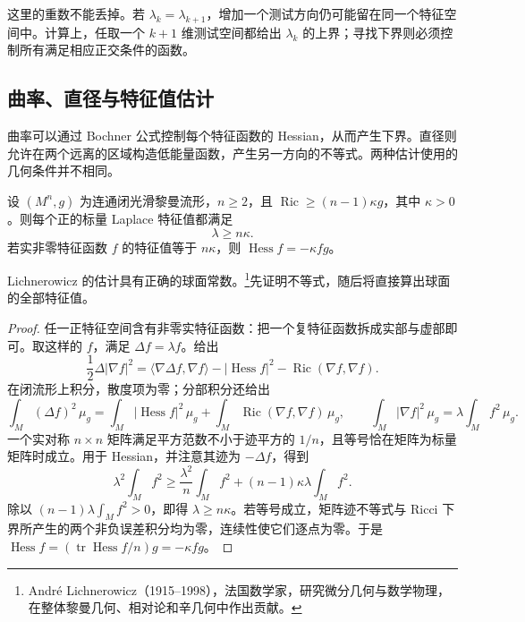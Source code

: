 这里的重数不能丢掉。若 \(\lambda_k=\lambda_{k+1}\)，增加一个测试方向仍可能留在同一个特征空间中。计算上，任取一个 \(k+1\) 维测试空间都给出 \(\lambda_k\) 的上界；寻找下界则必须控制所有满足相应正交条件的函数。

\subsection{曲率、直径与特征值估计}
\label{g3:subsec:1604:02}
曲率可以通过 Bochner 公式控制每个特征函数的 Hessian，从而产生下界。直径则允许在两个远离的区域构造低能量函数，产生另一方向的不等式。两种估计使用的几何条件并不相同。

\begin{theorem}\label{g3:thm:lichnerowicz-bound}
	设 \((M^n,g)\) 为连通闭光滑黎曼流形，\(n\ge2\)，且
	\(\operatorname{Ric}\ge(n-1)\kappa g\)，其中 \(\kappa>0\)。则每个正的标量 Laplace 特征值都满足
	\[
		\lambda\ge n\kappa.
	\]
	若实非零特征函数 \(f\) 的特征值等于 \(n\kappa\)，则
	\(\operatorname{Hess}f=-\kappa f g\)。
\end{theorem}
Lichnerowicz 的估计具有正确的球面常数。\footnote{André Lichnerowicz（1915--1998），法国数学家，研究微分几何与数学物理，在整体黎曼几何、相对论和辛几何中作出贡献。}先证明不等式，随后将直接算出球面的全部特征值。
\begin{proof}
	任一正特征空间含有非零实特征函数：把一个复特征函数拆成实部与虚部即可。取这样的 \(f\)，满足 \(\Delta f=\lambda f\)。给出
	\[
		\frac12\Delta|\nabla f|^2
		=\langle\nabla\Delta f,\nabla f\rangle
		 -|\operatorname{Hess}f|^2-\operatorname{Ric}(\nabla f,\nabla f).
	\]
	在闭流形上积分，散度项为零；分部积分还给出
	\[
		\int_M(\Delta f)^2\,\mu_g
		=\int_M|\operatorname{Hess}f|^2\,\mu_g
		 +\int_M\operatorname{Ric}(\nabla f,\nabla f)\,\mu_g,
		\qquad
		\int_M|\nabla f|^2\,\mu_g=\lambda\int_Mf^2\,\mu_g.
	\]
	一个实对称 \(n\times n\) 矩阵满足平方范数不小于迹平方的 \(1/n\)，且等号恰在矩阵为标量矩阵时成立。用于 Hessian，并注意其迹为 \(-\Delta f\)，得到
	\[
		\lambda^2\int_Mf^2
		\ge\frac{\lambda^2}{n}\int_Mf^2
		 +(n-1)\kappa\lambda\int_Mf^2.
	\]
	除以 \((n-1)\lambda\int_Mf^2>0\)，即得 \(\lambda\ge n\kappa\)。若等号成立，矩阵迹不等式与 Ricci 下界所产生的两个非负误差积分均为零，连续性使它们逐点为零。于是
	\(\operatorname{Hess}f=(\operatorname{tr}\operatorname{Hess}f/n)g=-\kappa f g\)。
\end{proof}

